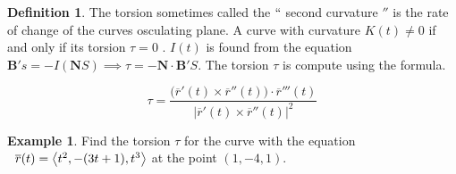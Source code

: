 \documentclass[11pt,a4paper]{article}
\theoremstyle{definition}
\newtheorem{defn}[thm]{Definition}
\newtheorem{exa}[thm]{Example}
\begin{document}
\begin{defn}


The torsion sometimes called the $``$ second curvature $''$ is the rate of change of the curves osculating plane. A curve with curvature $K(t) \neq 0$ if and only if its torsion $\tau = 0$ . $I(t)$ is found from the equation $\textbf{B}'s = -I(\textbf{N}S) \implies \tau = -\textbf{N}\cdot \textbf{B}'S$. The torsion $\tau$ is compute using the formula.

$$\tau = \frac{\big(\overline{r}'(t) \times \overline{r}''(t)\big)\cdot \overline{r}'''(t)}{\left|\overline{r}'(t)\times \overline{r}''(t)\right|^2
}$$
\end{defn}

\begin{exa}


Find the torsion $\tau$ for the curve with the equation $\hspace{0.2cm} \overline{r}(t) = \big\langle t^2 , -(3t + 1), t^3\big\rangle$ at the point $(1,-4,1)$.
\end{exa}
\end{document}
